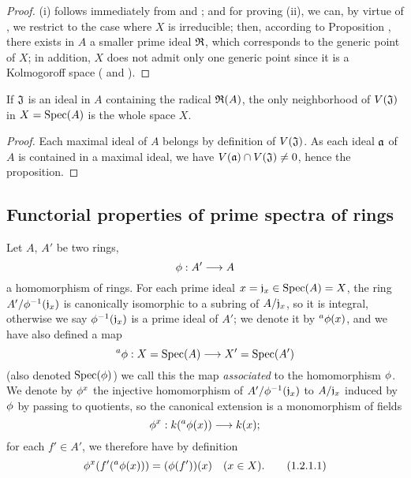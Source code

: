 \begin{proof}
\label{proof-1.1.1.14}
(i) follows immediately from  and
; and for
proving (ii), we can, by virtue of , we restrict to the
case where $X$ is irreducible; then, according to
Proposition , there exists
in $A$ a smaller prime ideal $\mathfrak{R}$, which corresponds to the generic point
of $X$; in addition, $X$ does not admit only one generic point since it is a Kolmogoroff
space ( and ).
\end{proof}

\begin{prop}[1.1.15]
\label{1.1.1.15}
If $\mathfrak{J}$ is an ideal in $A$ containing the radical $\mathfrak{R}(A)$, the only
neighborhood of $V(\mathfrak{J})$ in $X={\mathop{\mathrm{Spec}}\nolimits}(A)$ is the whole space $X$.
\end{prop}

\begin{proof}
\label{proof-1.1.1.15}
Each maximal ideal of $A$ belongs by definition of $V(\mathfrak{J})$.
As each ideal $\mathfrak{a}$ of $A$ is contained in a maximal ideal, we have
$V(\mathfrak{a})\cap V(\mathfrak{J})\neq 0$, hence the proposition.
\end{proof}

\subsection{Functorial properties of prime spectra of rings}
\label{subsection-func-prop}

\begin{env}[1.2.1]
\label{1.1.2.1}
Let $A$, $A'$ be two rings,
\[
  \phi:A'\longrightarrow A
\]
a homomorphism of rings. For each prime ideal $x=\mathfrak{j}_x\in{\mathop{\mathrm{Spec}}\nolimits}(A)=X$, the
ring $A'/\phi^{-1}(\mathfrak{j}_x)$ is canonically isomorphic to a subring of
$A/\mathfrak{j}_x$, so it is integral, otherwise we say
$\phi^{-1}(\mathfrak{j}_x)$ is a prime ideal of $A'$; we denote it by
${}^a\phi(x)$, and we have also defined a map
\[
  {}^a\phi:X={\mathop{\mathrm{Spec}}\nolimits}(A)\longrightarrow X'={\mathop{\mathrm{Spec}}\nolimits}(A')
\]
(also denoted ${\mathop{\mathrm{Spec}}\nolimits}(\phi)$) we call this the map \emph{associated} to the
homomorphism $\phi$. We denote by $\phi^x$ the injective homomorphism of
$A'/\phi^{-1}(\mathfrak{j}_x)$ to $A/\mathfrak{j}_x$ induced by $\phi$ by
passing to quotients, so the canonical extension is a monomorphism of fields
\[
  \phi^x:k({}^a\phi(x))\longrightarrow k(x);
\]
for each $f'\in A'$, we therefore have by definition
\[
  \phi^x(f'({}^a\phi(x)))=(\phi(f'))(x)\quad(x\in X).
  \tag{1.2.1.1}
\]
\end{env}

